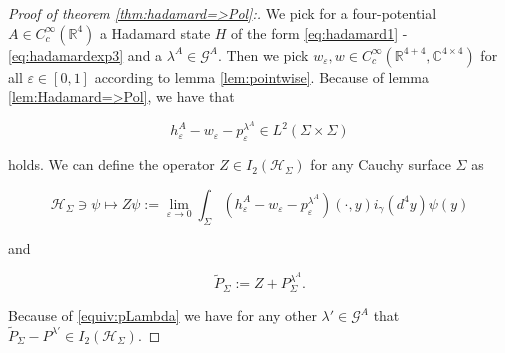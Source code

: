 \documentclass[a4paper,11pt]{article}
\begin{document}
\begin{proof}[Proof of theorem \ref{thm:hadamard=>Pol}:]
We pick for a four-potential \(A\in C_c^\infty(\mathbb{R}^4)\) a Hadamard state \(H\) of the form \eqref{eq:hadamard1} -\eqref{eq:hadamardexp3} 
and a \(\lambda^A\in\mathcal{G}^A\). Then we pick 
\(w_\varepsilon,w \in C_c^\infty(\mathbb{R}^{4+4},\mathbb{C}^{4\times 4})\) for all \(\varepsilon\in [0,1]\) according to lemma \ref{lem:pointwise}.
Because of lemma \ref{lem:Hadamard=>Pol}, we have that

\begin{equation}
h_\varepsilon^A-w_\varepsilon-p^{\lambda^A}_\varepsilon \in L^2(\Sigma\times\Sigma)
\end{equation}

holds. We can define the operator \(Z \in I_2(\mathcal{H}_\Sigma)\) for any Cauchy surface \(\Sigma\) as

\begin{equation}
\mathcal{H}_\Sigma\ni \psi\mapsto Z \psi := \lim_{\varepsilon \rightarrow 0} 
\int_{\Sigma} (h_\varepsilon^A-w_\varepsilon-p^{\lambda^A}_\varepsilon)(\cdot,y) i_\gamma(d^4y) \psi(y) 
\end{equation}

and

\begin{equation}
\tilde{P}_\Sigma:=Z + P^{\lambda^A}_\Sigma.
\end{equation}

Because of \eqref{equiv:pLambda} we have for any other \(\lambda' \in\mathcal{G}^A\) that \(\tilde{P}_\Sigma-P^{\lambda'}\in I_2(\mathcal{H}_\Sigma)\).


\end{proof}
\end{document}
